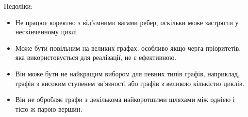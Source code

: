 Недоліки:
\begin{itemize}
    \item Не працює коректно з від'ємними вагами ребер, оскільки може застрягти у нескінченному циклі.
    \item Може бути повільним на великих графах, особливо якщо черга пріоритетів, яка використовується для реалізації, не є ефективною.
    \item Він може бути не найкращим вибором для певних типів графів, наприклад, графів з високим ступенем зв'язності або графів з великою кількістю циклів.
    \item Він не обробляє графи з декількома найкоротшими шляхами між однією і тією ж парою вершин.
\end{itemize}
